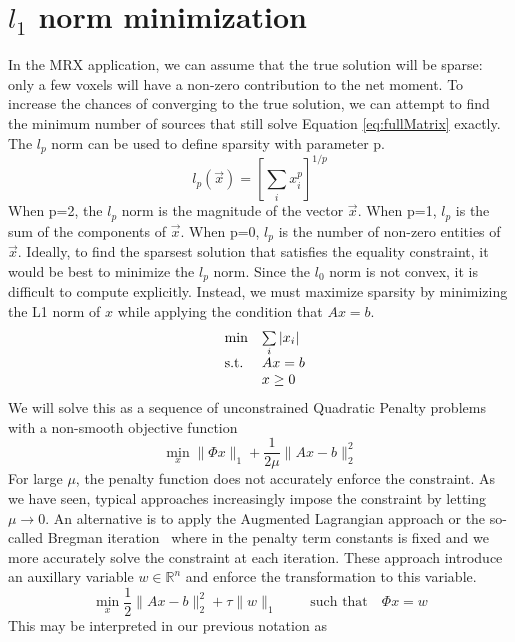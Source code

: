 \documentclass[a4paper]{article}
\begin{document}
\section{$l_1$ norm minimization}
In the MRX application, we can assume that the true solution will be sparse:
only a few voxels will have a non-zero contribution to the net moment.  To
increase the chances of converging to the true solution, we can attempt to
find the minimum number of sources that still solve Equation
\ref{eq:fullMatrix} exactly.  The $l_p$ norm can be used to define sparsity with parameter p.
 \begin{equation}
 l_{p}(\vec{x})=\left[\sum_{i}x_{i}^{p}\right]^{1/p} 
 \end{equation}
When p=2, the $l_{p}$ norm is the magnitude of the vector $\vec{x}$.  When p=1, $l_{p}$ is the sum of the components of $\vec{x}$.  When p=0, $l_{p}$ is the number of non-zero entities of $\vec{x}$.  Ideally, to find the sparsest solution that satisfies the equality constraint, it would be best to minimize the $l_{p}$ norm.  Since the $l_0$ norm is not convex, it is difficult to compute explicitly. Instead, we must maximize sparsity by minimizing the L1 norm of $x$ while applying the condition that $Ax = b$.
\begin{equation}
\centering
  \begin{array}{ll@{}r@{}r@{}l}
    \text{min} & \sum\limits_{i} |x_i| \\[\jot]
    \text{s.t.}& Ax = b \\
    & \multicolumn{4}{l}{x \geq 0}
  \end{array}
\end{equation}
We will solve this as a sequence of unconstrained Quadratic
Penalty problems with a non-smooth objective function
\[
\min_x \|\Phi x\|_1 + \frac{1}{2 \mu}\|Ax-b\|_2^2
\]
For large $\mu$, the penalty function does not accurately enforce the
constraint. As we have seen, typical approaches increasingly impose the constraint
by letting $\mu \rightarrow 0$. 
An alternative is to apply the Augmented Lagrangian approach or the 
so-called Bregman iteration~\cite{goldstein2009split}
where in the penalty term constants is fixed and we more accurately solve
the constraint at each iteration. These approach introduce an
auxillary variable $w \in \mathbb{R}^n$ and enforce the transformation
to this variable.
\[
  \min_x \frac{1}{2} \|Ax -b\|_2^2 + \tau \|w\|_1
\qquad
\text{ such that}
\quad
\Phi x = w
\]
This may be interpreted in our previous notation as
\end{document}

